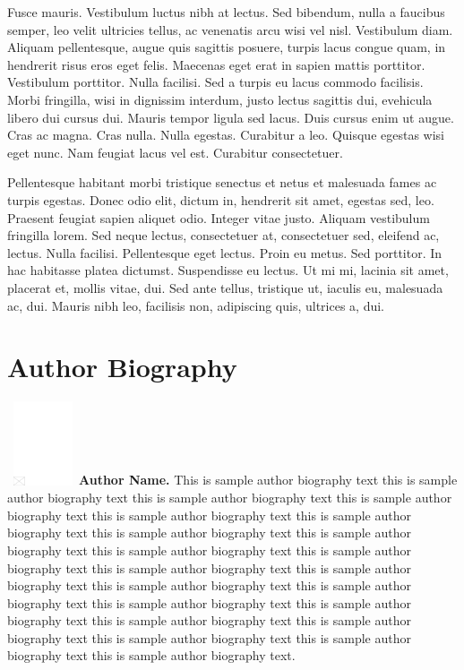 \documentclass[AMS,STIX2COL]{WileyNJD-v2}
\begin{document}
    Fusce mauris. Vestibulum luctus nibh at lectus. Sed bibendum, nulla a faucibus semper, leo velit ultricies tellus, ac
    venenatis arcu wisi vel nisl. Vestibulum diam. Aliquam pellentesque, augue quis sagittis posuere, turpis lacus congue
    quam, in hendrerit risus eros eget felis. Maecenas eget erat in sapien mattis porttitor. Vestibulum porttitor. Nulla
    facilisi. Sed a turpis eu lacus commodo facilisis. Morbi fringilla, wisi in dignissim interdum, justo lectus sagittis dui, evehicula libero dui cursus dui. Mauris tempor ligula sed lacus. Duis cursus enim ut augue. Cras ac magna. Cras nulla.
    Nulla egestas. Curabitur a leo. Quisque egestas wisi eget nunc. Nam feugiat lacus vel est. Curabitur consectetuer.

    Pellentesque habitant morbi tristique senectus et netus et malesuada fames ac turpis egestas. Donec odio elit,
    dictum in, hendrerit sit amet, egestas sed, leo. Praesent feugiat sapien aliquet odio. Integer vitae justo. Aliquam
    vestibulum fringilla lorem. Sed neque lectus, consectetuer at, consectetuer sed, eleifend ac, lectus. Nulla facilisi.
    Pellentesque eget lectus. Proin eu metus. Sed porttitor. In hac habitasse platea dictumst. Suspendisse eu lectus. Ut
    mi mi, lacinia sit amet, placerat et, mollis vitae, dui. Sed ante tellus, tristique ut, iaculis eu, malesuada ac, dui.
    Mauris nibh leo, facilisis non, adipiscing quis, ultrices a, dui.

    \nocite{*}%


    \section*{Author Biography}

    \begin{biography}{\includegraphics[width=60pt,height=70pt,draft]{empty}}{\textbf{Author Name.} This is sample author biography text this is sample author biography text this is sample author biography text this is sample author biography text this is sample author biography text this is sample author biography text this is sample author biography text this is sample author biography text this is sample author biography text this is sample author biography text this is sample author biography text this is sample author biography text this is sample author biography text this is sample author biography text this is sample author biography text this is sample author biography text this is sample author biography text this is sample author biography text this is sample author biography text this is sample author biography text this is sample author biography text.}
    \end{biography}
\end{document}
